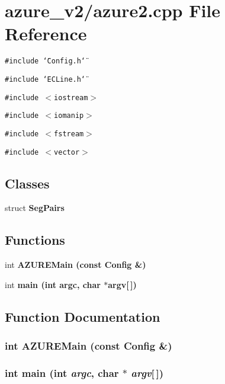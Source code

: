\section{azure\_\-v2/azure2.cpp File Reference}
\label{azure2_8cpp}
{\tt \#include \char`\"{}Config.h\char`\"{}}\par
{\tt \#include \char`\"{}ECLine.h\char`\"{}}\par
{\tt \#include $<$iostream$>$}\par
{\tt \#include $<$iomanip$>$}\par
{\tt \#include $<$fstream$>$}\par
{\tt \#include $<$vector$>$}\par
\subsection*{Classes}
\begin{CompactItemize}
\item 
struct \bf{Seg\-Pairs}
\end{CompactItemize}
\subsection*{Functions}
\begin{CompactItemize}
\item 
int \bf{AZUREMain} (const \bf{Config} \&)
\item 
int \bf{main} (int argc, char $\ast$argv[$\,$])
\end{CompactItemize}


\subsection{Function Documentation}
\subsubsection{\setlength{\rightskip}{0pt plus 5cm}int AZUREMain (const \bf{Config} \&)}\label{azure2_8cpp_15a1811fb3c57cf750d591c3b7c12a3c}


\subsubsection{\setlength{\rightskip}{0pt plus 5cm}int main (int {\em argc}, char $\ast$ {\em argv}[$\,$])}\label{azure2_8cpp_0ddf1224851353fc92bfbff6f499fa97}


